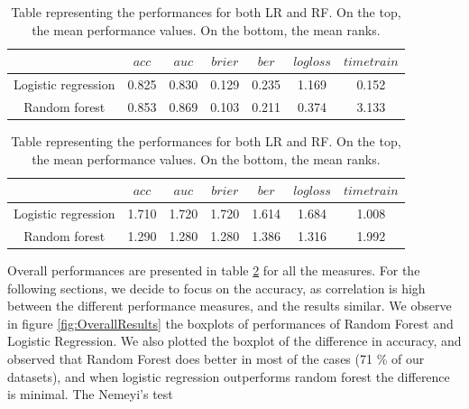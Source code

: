 \documentclass[12pt]{article}
\begin{document}
\begin{table}[h]
   \begin{tabular}{| c | c | c | c | c | c | c |}
     \hline
		  & $acc$ & $auc$ & $brier$ & $ber$ & $logloss$ & $timetrain$ \\ \hline
     Logistic regression & 0.825 & 0.830 & 0.129 & 0.235 & 1.169 & 0.152 \\ \hline
     Random forest & 0.853 & 0.869 & 0.103 & 0.211 & 0.374 & 3.133 \\ \hline
   \end{tabular}
	\quad
	   \begin{tabular}{| c | c | c | c | c | c | c |}
     \hline
		  & $acc$ & $auc$ & $brier$ & $ber$ & $logloss$ & $timetrain$ \\ \hline
     Logistic regression & 1.710 & 1.720 & 1.720 & 1.614 & 1.684 & 1.008 \\ \hline
     Random forest & 1.290 & 1.280 & 1.280 & 1.386 & 1.316 & 1.992 \\ \hline
   \end{tabular}
	\caption{Table representing the performances for both LR and RF. On the top, the mean performance values. On the bottom, the mean ranks.}
  \label{table:meanperfs}
\end{table}


Overall performances are presented in table \ref{table:meanperfs} for all the measures. For the following sections, we decide to focus on the accuracy, as correlation is high between the different performance measures, and the results similar. We observe in figure \ref{fig:OverallResults} the boxplots of performances of Random Forest and Logistic Regression. We also plotted the boxplot of the difference in accuracy, and observed that Random Forest does better in most of the cases (71 \% of our datasets), and when logistic regression outperforms random forest the difference is minimal. The Nemeyi's test
\end{document}

